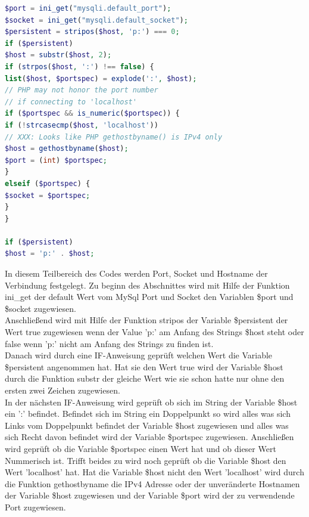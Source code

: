 \newpage

\begin{lstlisting}[language=PHP, caption=mysqli.php/function-db\_connect3, firstnumber=41]
$port = ini_get("mysqli.default_port");
$socket = ini_get("mysqli.default_socket");
$persistent = stripos($host, 'p:') === 0;
if ($persistent)
$host = substr($host, 2);
if (strpos($host, ':') !== false) {
list($host, $portspec) = explode(':', $host);
// PHP may not honor the port number 
// if connecting to 'localhost'
if ($portspec && is_numeric($portspec)) {
if (!strcasecmp($host, 'localhost'))
// XXX: Looks like PHP gethostbyname() is IPv4 only
$host = gethostbyname($host);
$port = (int) $portspec;
}
elseif ($portspec) {
$socket = $portspec;
}
}

if ($persistent)
$host = 'p:' . $host;
\end{lstlisting}

In diesem Teilbereich des Codes werden Port, Socket und Hostname der Verbindung festgelegt. Zu beginn des Abschnittes wird mit Hilfe der Funktion ini\_get der default Wert vom MySql Port und Socket den Variablen \$port und \$socket zugewiesen.\\
Anschließend wird mit Hilfe der Funktion stripos der Variable \$persistent der Wert true zugewiesen wenn der Value 'p:' am Anfang des Strings \$host steht oder false wenn 'p:' nicht am Anfang des Strings zu finden ist.\\
Danach wird durch eine IF-Anweisung geprüft welchen Wert die Variable \$persistent angenommen hat. Hat sie den Wert true wird der Variable \$host durch die Funktion substr der gleiche Wert wie sie schon hatte nur ohne den ersten zwei Zeichen zugewiesen.\\
In der nächsten IF-Anweisung wird geprüft ob sich im String der Variable \$host ein ':' befindet. Befindet sich im String ein Doppelpunkt so wird alles was sich Links vom Doppelpunkt befindet der Variable \$host zugewiesen und alles was sich Recht davon befindet wird der Variable \$portspec zugewiesen. Anschließen wird geprüft ob die Variable \$portspec einen Wert hat und ob dieser Wert Nummerisch ist. Trifft beides zu wird noch geprüft ob die Variable \$host den Wert 'localhost' hat. Hat die Variable \$host nicht den Wert 'localhost' wird durch die Funktion gethostbyname die IPv4 Adresse oder der unveränderte Hostnamen der Variable \$host zugewiesen und der Variable \$port wird der zu verwendende Port zugewiesen.

